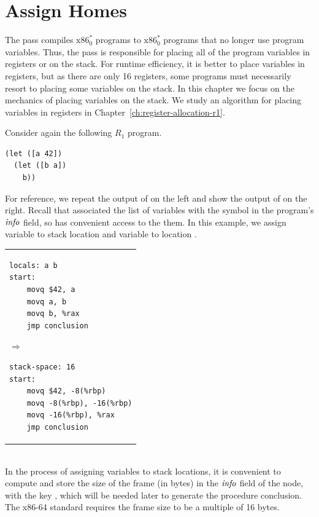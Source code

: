 \documentclass[11pt]{book}
\begin{document}
\section{Assign Homes}
\label{sec:assign-r1}

The  pass compiles $\text{x86}^{*}_0$ programs to
$\text{x86}^{*}_0$ programs that no longer use program variables.
Thus, the  pass is responsible for placing all of
the program variables in registers or on the stack. For runtime
efficiency, it is better to place variables in registers, but as there
are only 16 registers, some programs must necessarily resort to
placing some variables on the stack. In this chapter we focus on the
mechanics of placing variables on the stack. We study an algorithm for
placing variables in registers in
Chapter~\ref{ch:register-allocation-r1}.

Consider again the following $R_1$ program.
\begin{lstlisting}
(let ([a 42])
  (let ([b a])
    b))
\end{lstlisting}
For reference, we repeat the output of  on
the left and show the output of  on the right.
Recall that  associated the list of
variables with the  symbol in the program's $\mathit{info}$
field, so  has convenient access to the them.  In
this example, we assign variable  to stack location
 and variable  to location .\\
\begin{tabular}{l}
  \begin{minipage}{0.4\textwidth}
\begin{lstlisting}[basicstyle=\ttfamily\footnotesize]
locals: a b
start: 
    movq $42, a
    movq a, b
    movq b, %rax
    jmp conclusion
\end{lstlisting}
\end{minipage}
{$\Rightarrow$}
\begin{minipage}{0.4\textwidth}
\begin{lstlisting}[basicstyle=\ttfamily\footnotesize]
stack-space: 16
start:
    movq $42, -8(%rbp)
    movq -8(%rbp), -16(%rbp)
    movq -16(%rbp), %rax
    jmp conclusion
\end{lstlisting}
\end{minipage}
\end{tabular} \\

In the process of assigning variables to stack locations, it is
convenient to compute and store the size of the frame (in bytes) in
the $\mathit{info}$ field of the  node, with the key
, which will be needed later to generate the
procedure conclusion. The x86-64 standard requires the frame size to
be a multiple of 16 bytes.
\end{document}
